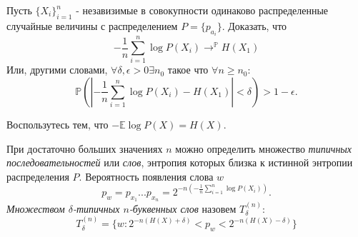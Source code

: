 \begin{problem}
Пусть $\{X_i\}_{i=1}^n$ - незавизимые в совокупности одинаково распределенные случайные величины с распределением $P = \{p_{a_i}\}$. Доказать, что 
\begin{equation}
-\frac{1}{n} \sum_{i = 1}^n \log P(X_i) \rightarrow^{\mathbb{P}} H(X_1)
\end{equation}
Или, другими словами, $\forall \delta, \epsilon > 0 \exists n_0$ такое что $\forall n \geq n_0$:
\begin{equation}
\mathbb{P}(|-\frac{1}{n} \sum_{i = 1}^n \log P(X_i) - H(X_1)| < \delta) > 1-\epsilon.
\end{equation}

\begin{ordre}
Воспользутесь тем, что $-\mathbb{E} \log P(X) = H(X)$.
\end{ordre}
\end{problem}

\begin{remark} При достаточно больших значениях $n$ можно определить множество \textit{типичных последовательностей} или \textit{слов}, энтропия которых близка к истинной энтропии распределения $P$. Вероятность появления слова $w$
\begin{equation}
p_w = p_{x_1}...p_{x_n} = 2^{-n (-\frac{1}{n} \sum_{i = 1}^n \log P(X_i))}.
\end{equation}
\textit{Множеством $\delta$-типичных $n$-буквенных слов} назовем $T_{\delta}^{(n)}$:
\begin{equation}
T_{\delta}^{(n)} = \{w: 2^{-n(H(X) + \delta)} < p_w < 2^{-n(H(X) - \delta)} \}
\end{equation}
\end{remark}

